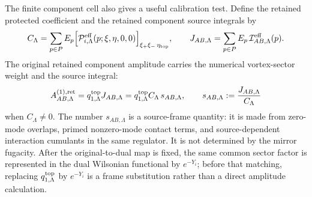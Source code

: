 \begin{remark}
\label{rem:glsm-one-vortex-source-frame-calibration-map}
The finite component cell also gives a useful calibration test.  Define the
retained protected coefficient and the retained component source integrals by
\[
  C_\Lambda
  =
  \sum_{p\in P}
  E_p
  \Bigl[
    \mathcal P^{\rm eff}_{i,\Lambda}(p;\xi,\eta,0,0)
  \Bigr]_{\xi_+\xi_-\,\eta_{\rm top}},
  \qquad
  J_{AB,\Lambda}
  =
  \sum_{p\in P}E_p\,\mathcal I^{\rm eff}_{AB,\Lambda}(p).
\]
The original retained component amplitude carries the numerical vortex-sector
weight and the source integral:
\[
  A^{(1),{\rm ret}}_{AB,\Lambda}
  =
  q^{\rm top}_{1,\Lambda}J_{AB,\Lambda}
  =
  q^{\rm top}_{1,\Lambda}C_\Lambda\,s_{AB,\Lambda},
  \qquad
  s_{AB,\Lambda}:=\frac{J_{AB,\Lambda}}{C_\Lambda}
\]
when \(C_\Lambda\neq0\).  The number \(s_{AB,\Lambda}\) is a source-frame
quantity: it is made from zero-mode overlaps, primed nonzero-mode contact
terms, and source-dependent interaction cumulants in the same regulator.  It is
not determined by the mirror fugacity.
After the original-to-dual map is fixed, the same common sector factor is
represented in the dual Wilsonian functional by \(e^{-Y_i}\); before that
matching, replacing \(q^{\rm top}_{1,\Lambda}\) by \(e^{-Y_i}\) is a frame
substitution rather than a direct amplitude calculation.


\end{remark}
